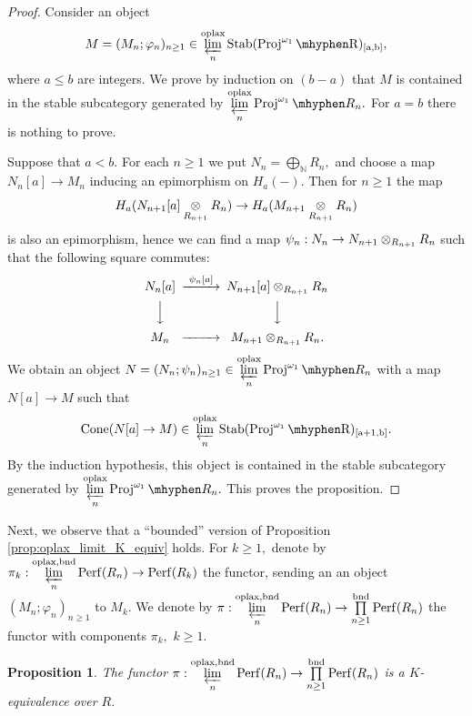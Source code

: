 \documentclass[11pt,leqno]{amsart}
\newtheorem{prop}[theo]{Proposition}
\numberwithin{equation}{section}
\def\N{\mathbb{N}}
\newcommand{\tens}[1]{%
  \mathbin{\mathop{\otimes}\displaylimits_{#1}}%
}
\newcommand{\hy}{\mhyphen}
\newcommand{\prolim}[1][]{\mathop{\varprojlim}\limits_{#1}}
\newcommand{\biggplus}[1][]{\mathop{\bigoplus}\limits_{#1}}
\newcommand{\prodd}[1][]{\mathop{\prod}\limits_{#1}}
\newcommand{\bnd}{\operatorname{bnd}}
\newcommand{\oplax}{\operatorname{oplax}}
\newcommand{\Proj}{\operatorname{Proj}}
\newcommand{\Cone}{\operatorname{Cone}}
\newcommand{\Perf}{\operatorname{Perf}}
\newcommand{\Stab}{\rm Stab}
\begin{document}
\begin{proof}
Consider an object 
\begin{equation*}
M=(M_n;\varphi_n)_{n\geq 1}\in \prolim[n]^{\oplax}\Stab(\Proj^{\omega_1}\hy R)_{[a,b]},
\end{equation*}
where $a\leq b$ are integers.
We prove by induction on $(b-a)$ that $M$ is contained in the stable subcategory generated by $\prolim[n]^{\oplax}\Proj^{\omega_1}\hy R_n.$ For $a=b$ there is nothing to prove.

Suppose that $a<b.$ For each $n\geq 1$ we put $N_n=\biggplus[\N]R_n,$ and choose a map $N_n[a]\to M_n$ inducing an epimorphism on $H_a(-).$ Then for $n\geq 1$ the map $$H_a(N_{n+1}[a]\tens{R_{n+1}}R_n)\to H_a(M_{n+1}\tens{R_{n+1}}R_n)$$ is also an epimorphism, hence we can find a map $\psi_n:N_n\to N_{n+1}\tens{R_{n+1}}R_n$ such that the following square commutes:
\begin{equation*}
\begin{CD}
N_n[a] @>{\psi_n[a]}>> N_{n+1}[a]\tens{R_{n+1}}R_n\\
@VVV @VVV\\  
M_n @>>> M_{n+1}\tens{R_{n+1}}R_n.
\end{CD}
\end{equation*}     
We obtain an object $N=(N_n;\psi_n)_{n\geq 1}\in \prolim[n]^{\oplax}\Proj^{\omega_1}\hy R_n$ with a map $N[a]\to M$ such that
\begin{equation*}
\Cone(N[a]\to M)\in \prolim[n]^{\oplax}\Stab(\Proj^{\omega_1}\hy R)_{[a+1,b]}.
\end{equation*} 
By the induction hypothesis, this object is contained in the stable subcategory generated by $\prolim[n]^{\oplax}\Proj^{\omega_1}\hy R_n.$ This proves the proposition. 
\end{proof}

Next, we observe that a ``bounded'' version of Proposition \ref{prop:oplax_limit_K_equiv} holds. For $k\geq 1,$ denote by $\pi_k:\prolim[n]^{\oplax,\bnd}\Perf(R_n)\to\Perf(R_k)$ the functor, sending an an object $(M_n;\varphi_n)_{n\geq 1}$ to $M_k.$ We denote by $\pi:\prolim[n]^{\oplax,\bnd}\Perf(R_n)\to\prodd[n\geq 1]^{\bnd}\Perf(R_n)$ the functor with components $\pi_k,$ $k\geq 1.$

\begin{prop}\label{prop:oplax_limit_K_equiv_bounded}
The functor $\pi:\prolim[n]^{\oplax,\bnd}\Perf(R_n)\to\prodd[n\geq 1]^{\bnd}\Perf(R_n)$ is a $K$-equivalence over $R.$  
\end{prop}
\end{document}
